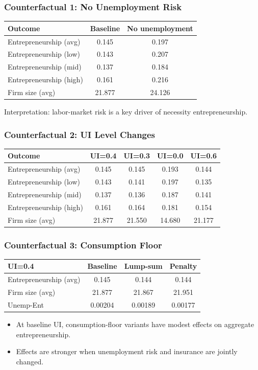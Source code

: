 ﻿\documentclass[english,aspectratio=169]{beamer}
\begin{document}
\begin{frame}
\frametitle{Counterfactual 1: No Unemployment Risk}
\begin{center}
\small
\begin{tabular}{lcc}
\hline
Outcome & Baseline & No unemployment \\
\hline
Entrepreneurship (avg) & 0.145 & 0.197 \\
Entrepreneurship (low) & 0.143 & 0.207 \\
Entrepreneurship (mid) & 0.137 & 0.184 \\
Entrepreneurship (high) & 0.161 & 0.216 \\
Firm size (avg) & 21.877 & 24.126 \\
\hline
\end{tabular}
\end{center}
\vspace{1mm}
Interpretation: labor-market risk is a key driver of necessity entrepreneurship.
\end{frame}

\begin{frame}
\frametitle{Counterfactual 2: UI Level Changes}
\begin{center}
\small
\begin{tabular}{lcccc}
\hline
Outcome & UI=0.4 & UI=0.3 & UI=0.0 & UI=0.6 \\
\hline
Entrepreneurship (avg) & 0.145 & 0.145 & 0.193 & 0.144 \\
Entrepreneurship (low) & 0.143 & 0.141 & 0.197 & 0.135 \\
Entrepreneurship (mid) & 0.137 & 0.136 & 0.187 & 0.141 \\
Entrepreneurship (high) & 0.161 & 0.164 & 0.181 & 0.154 \\
Firm size (avg) & 21.877 & 21.550 & 14.680 & 21.177 \\
\hline
\end{tabular}
\end{center}
\end{frame}

\begin{frame}
\frametitle{Counterfactual 3: Consumption Floor}
\begin{center}
\small
\begin{tabular}{lccc}
\hline
UI=0.4 & Baseline & Lump-sum & Penalty \\
\hline
Entrepreneurship (avg) & 0.145 & 0.144 & 0.144 \\
Firm size (avg) & 21.877 & 21.867 & 21.951 \\
Unemp-Ent & 0.00204 & 0.00189 & 0.00177 \\
\hline
\end{tabular}
\end{center}
\vspace{2mm}
\begin{itemize}
\item At baseline UI, consumption-floor variants have modest effects on aggregate entrepreneurship.
\item Effects are stronger when unemployment risk and insurance are jointly changed.
\end{itemize}
\end{frame}
\end{document}
